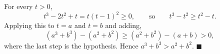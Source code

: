 For every $t>0$,
\[t^3-2t^2+t=t(t-1)^2\ge0,\qquad\text{so}\qquad t^3-t^2\ge t^2-t .\]
Applying this to $t=a$ and $t=b$ and adding,
\[\left(a^3+b^3\right)-\left(a^2+b^2\right)\ge\left(a^2+b^2\right)-(a+b)>0,\]
where the last step is the hypothesis. Hence $a^3+b^3>a^2+b^2$. $\blacksquare$
